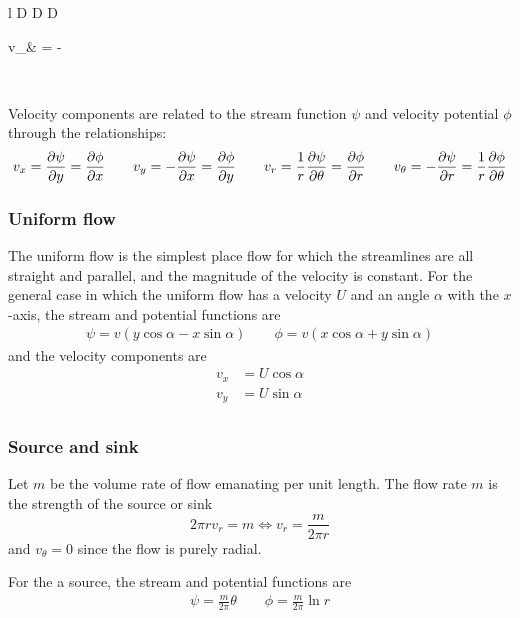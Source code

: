 \documentclass[10pt, twocolumn]{article}
\begin{document}
\begin{table*}[ht]
\begin{tabular}{ %
      l D D D
    }
\begin{aligned}
      v_\theta & = -
    \end{aligned}                       \\
    \bottomrule
  \end{tabular}
  \begin{tablenotes}
    \item Velocity components are related to the stream function \(\psi\) and velocity potential \(\phi\) through the relationships:
    \[
      v_x = \frac{\partial \psi}{\partial y} = \frac{\partial \phi}{\partial x}
      \qquad v_y = -\frac{\partial \psi}{\partial x} = \frac{\partial \phi}{\partial y}
      \qquad v_r = \frac{1}{r} \frac{\partial \psi}{\partial \theta} = \frac{\partial \phi}{\partial r}
      \qquad v_\theta = -\frac{\partial \psi}{\partial r} = \frac{1}{r} \frac{\partial \phi}{\partial \theta}
    \]
  \end{tablenotes}
\end{table*}


\subsubsection{Uniform flow}
The uniform flow is the simplest place flow for which the streamlines are all straight and parallel, and the magnitude of the velocity is constant.
For the general case in which the uniform flow has a velocity \(U\) and an angle \(\alpha\) with the \(x\)-axis, the stream and potential functions are
\begin{align*}
  \psi = v (y \cos\alpha - x \sin\alpha)
  \qquad \phi = v (x \cos\alpha + y \sin\alpha)
\end{align*}
and the velocity components are
\begin{align*}
  v_x & = U \cos\alpha \\
  v_y & = U \sin\alpha \\
\end{align*}


\subsubsection{Source and sink}
Let \(m\) be the volume rate of flow emanating per unit length.
The flow rate \(m\) is the strength of the source or sink
\[
  2\pi r v_r = m \iff v_r = \frac{m}{2\pi r}
\]
and \(v_\theta = 0\) since the flow is purely radial.

For the a source, the stream and potential functions are
\begin{align}
  \psi = \frac{m}{2\pi} \theta
  \qquad \phi = \frac{m}{2\pi} \ln r
\end{align}
\end{document}
